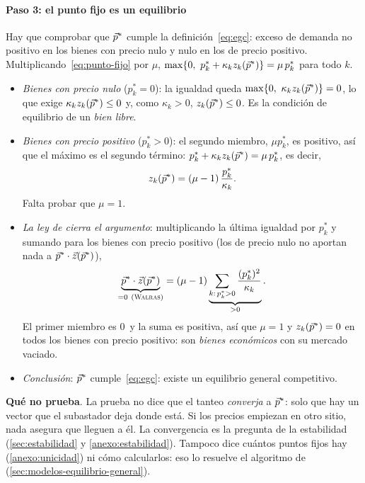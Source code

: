 \documentclass[11pt]{article}
\begin{document}
\paragraph{Paso 3: el punto fijo es un equilibrio}

Hay que comprobar que $\vec{p}^*$ cumple la definición~\eqref{eq:egc}: exceso de demanda no positivo en los bienes con precio nulo y nulo en los de precio positivo. Multiplicando~\eqref{eq:punto-fijo} por $\mu$, $\max\{0,\ p^*_k+\kappa_kz_k(\vect{p}^*)\}=\mu\,p^*_k$ para todo $k$.

\begin{itemize}
\item \emph{Bienes con precio nulo} ($p^*_k=0$): la igualdad queda $\max\{0,\ \kappa_kz_k(\vect{p}^*)\}=0$, lo que exige $\kappa_kz_k(\vec{p}^*)\leq 0$ y, como $\kappa_k>0$, $z_k(\vec{p}^*)\leq 0$. Es la condición de equilibrio de un \emph{bien libre}.
\item \emph{Bienes con precio positivo} ($p^*_k>0$): el segundo miembro, $\mu p^*_k$, es positivo, así que el máximo es el segundo término: $p^*_k+\kappa_kz_k(\vec{p}^*)=\mu\,p^*_k$, es decir,
  \[
  z_k(\vec{p}^*)=(\mu-1)\,\frac{p^*_k}{\kappa_k}.
  \]
  Falta probar que $\mu=1$.
\item \emph{La ley de  cierra el argumento}: multiplicando la última igualdad por $p^*_k$ y sumando para los bienes con precio positivo (los de precio nulo no aportan nada a $\vec{p}^*\cdot\vec{z}(\vec{p}^*)$),
  \[
  \underbrace{\vect{p}^*\cdot\vect{z}(\vect{p}^*)}_{=0\ \text{(\autor{Walras})}}=(\mu-1)\underbrace{\sum_{k:\,p^*_k>0}\frac{(p^*_k)^2}{\kappa_k}}_{>0}.
  \]
  El primer miembro es 0~y la suma es positiva, así que $\mu=1$ y $z_k(\vec{p}^*)=0$ en todos los bienes con precio positivo: son \emph{bienes económicos} con su mercado vaciado.
\item \emph{Conclusión}: $\vec{p}^*$ cumple~\eqref{eq:egc}: existe un equilibrio general competitivo.\findemo
\end{itemize}

\begin{anotaciones}
\textbf{Qué no prueba}. La prueba no dice que el tanteo \emph{converja} a $\vec{p}^*$: solo que hay un vector que el subastador deja donde está. Si los precios empiezan en otro sitio, nada asegura que lleguen a él. La convergencia es la pregunta de la estabilidad (\ref{sec:estabilidad} y \ref{anexo:estabilidad}). Tampoco dice cuántos puntos fijos hay (\ref{anexo:unicidad}) ni cómo calcularlos: eso lo resuelve el algoritmo de \textcite{Scarf1967Approximation} (\ref{sec:modelos-equilibrio-general}).
\end{anotaciones}
\end{document}
